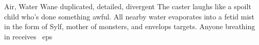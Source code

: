   {Air, Water}%
  {Wane}%
  {duplicated, detailed, divergent}%
  {}%
  {
    The caster laughs like a spoilt child who's done something awful.
    All nearby water evaporates into a fetid mist in the form of Sylf, mother of monsters, and envelops  targets.
    Anyone breathing in receives \showDam~\glspl{ep}}%
  {}
